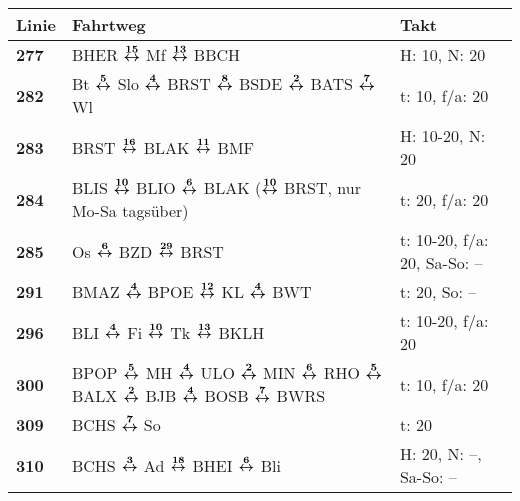 \begin{minipage}[t]{0.05\textwidth}
\phantom{Tor}
\end{minipage}
\else
\begin{minipage}[t]{0.05\textwidth}
\phantom{Tor}
\end{minipage}
\begin{minipage}[t]{0.45\textwidth}
\begin{tabular}{>{\bfseries}L{1.2cm}L{9.0cm}L{3.0cm}}
{\bfseries Linie} & {\bfseries Fahrtweg} & {\bfseries Takt} \\
\hline
\bus{} 277    & BHER $\boldsymbol{\overset{15}{\leftrightarrow}}$ Mf $\boldsymbol{\overset{13}{\leftrightarrow}}$ BBCH                                                                                                                              & H: 10, N: 20               \\
\bus{} 282    & Bt $\boldsymbol{\overset{5}{\leftrightarrow}}$ Slo $\boldsymbol{\overset{4}{\leftrightarrow}}$ BRST $\boldsymbol{\overset{8}{\leftrightarrow}}$ BSDE $\boldsymbol{\overset{2}{\leftrightarrow}}$ BATS $\boldsymbol{\overset{7}{\leftrightarrow}}$ Wl                                                                                & t: 10, f/a: 20             \\
\bus{} 283    & BRST $\boldsymbol{\overset{16}{\leftrightarrow}}$ BLAK $\boldsymbol{\overset{11}{\leftrightarrow}}$ BMF                                                                                                                             & H: 10-20, N: 20            \\
\bus{} 284    & BLIS $\boldsymbol{\overset{10}{\leftrightarrow}}$ BLIO $\boldsymbol{\overset{6}{\leftrightarrow}}$ BLAK ($\boldsymbol{\overset{10}{\leftrightarrow}}$ BRST, nur Mo-Sa tagsüber)                                                                                     & t: 20, f/a: 20             \\
\bus{} 285    & Os $\boldsymbol{\overset{6}{\leftrightarrow}}$ BZD $\boldsymbol{\overset{29}{\leftrightarrow}}$ BRST                                                                                                                                & t: 10-20, f/a: 20, Sa-So: -- \\
\bus{} 291    & BMAZ $\boldsymbol{\overset{4}{\leftrightarrow}}$ BPOE $\boldsymbol{\overset{12}{\leftrightarrow}}$ KL $\boldsymbol{\overset{4}{\leftrightarrow}}$ BWT                                                                                                               & t: 20, So: --              \\
\bus{} 296    & BLI $\boldsymbol{\overset{4}{\leftrightarrow}}$ Fi $\boldsymbol{\overset{10}{\leftrightarrow}}$ Tk $\boldsymbol{\overset{13}{\leftrightarrow}}$ BKLH                                                                                                                & t: 10-20, f/a: 20          \\
\bus{} 300    & BPOP $\boldsymbol{\overset{5}{\leftrightarrow}}$ MH $\boldsymbol{\overset{4}{\leftrightarrow}}$ ULO $\boldsymbol{\overset{2}{\leftrightarrow}}$ MIN $\boldsymbol{\overset{6}{\leftrightarrow}}$ RHO $\boldsymbol{\overset{5}{\leftrightarrow}}$ BALX $\boldsymbol{\overset{2}{\leftrightarrow}}$ BJB $\boldsymbol{\overset{4}{\leftrightarrow}}$ BOSB $\boldsymbol{\overset{7}{\leftrightarrow}}$ BWRS                              & t: 10, f/a: 20             \\
\bus{} 309    & BCHS $\boldsymbol{\overset{7}{\leftrightarrow}}$ So                                                                                                                                                 & t: 20                      \\
\bus{} 310    & BCHS $\boldsymbol{\overset{3}{\leftrightarrow}}$ Ad $\boldsymbol{\overset{18}{\leftrightarrow}}$ BHEI $\boldsymbol{\overset{6}{\leftrightarrow}}$ Bli                                                                                                               & H: 20, N: --, Sa-So: --    \\
\hline
\end{tabular}
\end{minipage}
